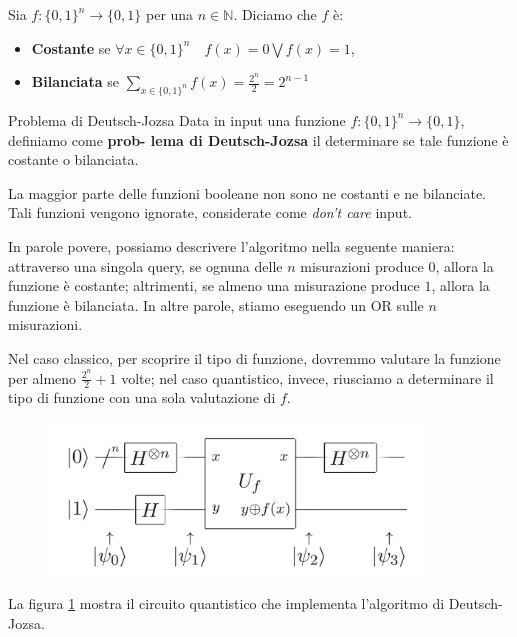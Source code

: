 Sia $f : \{0, 1\}^n \rightarrow \{0, 1\}$ per una $n \in \mathbb{N}$. Diciamo che $f$ è:
\begin{itemize}
    \item \textbf{Costante} se $\forall x \in \{0,1\}^n \quad f(x)=0 \bigvee f(x)=1$,
    \item \textbf{Bilanciata} se $\sum_{x \in \{0,1\}^n} f(x) = \frac{2^n}{2} = 2^{n-1}$
\end{itemize}
\begin{definition}{Problema di Deutsch-Jozsa}{}
    Data in input una funzione $f : \{0, 1\}^n \rightarrow \{0, 1\}$, definiamo come \textbf{prob-
    lema di Deutsch-Jozsa} il determinare se tale funzione è costante o bilanciata.
\end{definition}
\begin{oss}{}{}
    La maggior parte delle funzioni booleane non sono ne costanti e ne bilanciate. Tali funzioni
    vengono ignorate, considerate come \textit{don't care} input.
\end{oss}
In parole povere, possiamo descrivere l'algoritmo nella seguente maniera: attraverso una singola query, se ognuna delle $n$ misurazioni
produce $0$, allora la funzione è costante; altrimenti, se almeno una misurazione produce $1$, allora la funzione
è bilanciata. In altre parole, stiamo eseguendo un OR sulle $n$ misurazioni.

Nel caso classico, per scoprire il tipo di funzione, dovremmo valutare la funzione per almeno $\frac{2^n}{2} + 1$
volte; nel caso quantistico, invece, riusciamo a determinare il tipo di funzione con una sola valutazione di $f$.

\begin{figure}[h]
    \centering
    \includegraphics[width = 10cm]{./Images/dh.jpeg}
    \caption{}
    \label{fig16}
\end{figure}

La figura \ref{fig16} mostra il circuito quantistico che implementa l'algoritmo di Deutsch-Jozsa.

